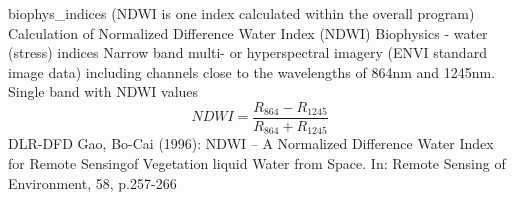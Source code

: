 %
{ %
biophys\_indices (NDWI is one index calculated within the overall program)
}
%
{ %
Calculation of Normalized Difference Water Index (NDWI)
}
%
{ %
Biophysics - water (stress) indices
}
%
{ %
Narrow band multi- or hyperspectral imagery (ENVI standard image data) including channels close to the wavelengths of 864nm and 1245nm.\bigskip
}
%
{ %
Single band with NDWI values
}
%
{ %
\begin{displaymath}
NDWI = \frac{R_{864}-R_{1245}}{R_{864}+R_{1245}}
\end{displaymath}
}
%
{ %
DLR-DFD
}
%
{ %
Gao, Bo-Cai (1996): NDWI – A Normalized Difference Water Index for Remote Sensingof Vegetation liquid Water from Space. In: Remote Sensing of Environment, 58, p.257-266
}
